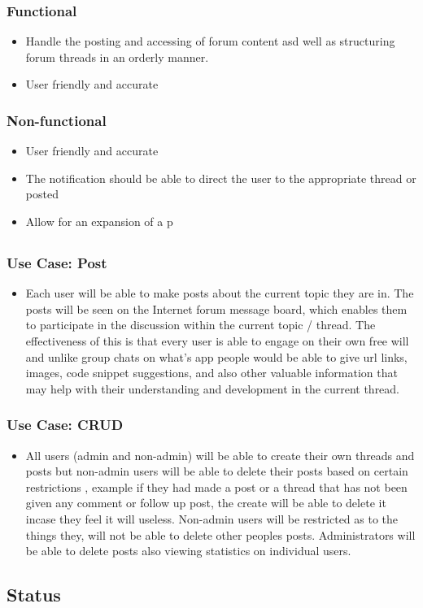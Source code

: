 \documentclass[12pt]{article}
\begin{document}
\subsubsection*{Functional}
\begin{itemize}
\item Handle the posting and accessing of forum content asd well as structuring forum threads in an orderly manner.
\item User friendly and accurate
\end{itemize}
\subsubsection*{Non-functional}
\begin{itemize}
\item User friendly and accurate
\item The notification should be able to direct the user to the appropriate thread or posted
\item Allow for an expansion of a p
\end{itemize}
\subsection*{}

\subsubsection{Use Case: Post}

\begin{itemize}
\item Each user will be able to make posts about the current topic they are in. The posts will be seen on the Internet forum message board, which enables them to participate in the discussion within the current topic / thread. The effectiveness of this is that every user is able to engage on their own free will and unlike group chats on what’s app people would be able to give url links, images, code snippet suggestions, and also other valuable information that may help with their understanding and development in the current thread.
\end{itemize}

\subsubsection{Use Case: CRUD}

\begin{itemize}
\item All users (admin and non-admin) will be able to create their own threads and posts but non-admin users will be able to delete their posts based on certain restrictions , example if they had made a post or a thread that has not been given any comment or follow up post, the create will be able to delete it incase they feel it will useless.
Non-admin users will be restricted as to the things they, will not be able to delete other peoples posts. Administrators will be able to delete posts also viewing statistics on individual users.
\end{itemize}


\subsection{Status}
\end{document}
